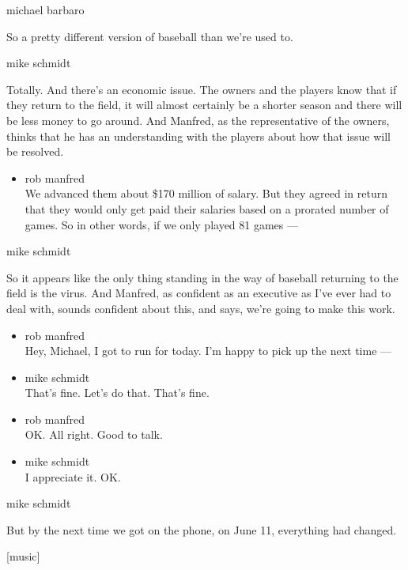 michael barbaro

So a pretty different version of baseball than we're used to.

mike schmidt

Totally. And there's an economic issue. The owners and the players know
that if they return to the field, it will almost certainly be a shorter
season and there will be less money to go around. And Manfred, as the
representative of the owners, thinks that he has an understanding with
the players about how that issue will be resolved.

\begin{itemize}
\tightlist
\item
  rob manfred\\
  We advanced them about \$170 million of salary. But they agreed in
  return that they would only get paid their salaries based on a
  prorated number of games. So in other words, if we only played 81
  games ---
\end{itemize}

mike schmidt

So it appears like the only thing standing in the way of baseball
returning to the field is the virus. And Manfred, as confident as an
executive as I've ever had to deal with, sounds confident about this,
and says, we're going to make this work.

\begin{itemize}
\item
  rob manfred\\
  Hey, Michael, I got to run for today. I'm happy to pick up the next
  time ---
\item
  mike schmidt\\
  That's fine. Let's do that. That's fine.
\item
  rob manfred\\
  OK. All right. Good to talk.
\item
  mike schmidt\\
  I appreciate it. OK.
\end{itemize}

mike schmidt

But by the next time we got on the phone, on June 11, everything had
changed.

{[}music{]}

